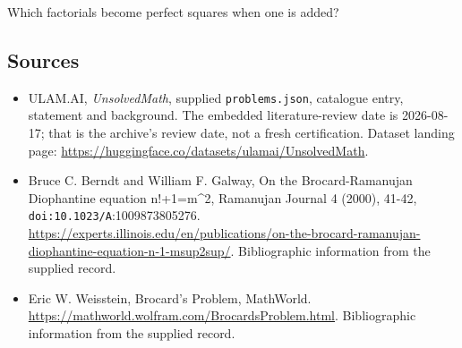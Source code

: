 \documentclass[11pt,a4paper]{article}
\begin{document}
Which factorials become perfect squares when one is added?

\subsection{Sources}

{\small

\begin{itemize}

\item[\hypertarget{source:statement:1}{S1}] ULAM.AI, \emph{UnsolvedMath}, supplied \texttt{problems.json}, catalogue entry, statement and background. The embedded literature-review date is 2026-08-17; that is the archive’s review date, not a fresh certification. Dataset landing page: \url{https://huggingface.co/datasets/ulamai/UnsolvedMath}.

\item[\hypertarget{source:statement:2}{S2}] Bruce C. Berndt and William F. Galway, On the Brocard-Ramanujan Diophantine equation n!+1=m\textasciicircum{}2, Ramanujan Journal 4 (2000), 41-42, \nolinkurl{doi:10.1023/A}:1009873805276. \url{https://experts.illinois.edu/en/publications/on-the-brocard-ramanujan-diophantine-equation-n-1-msup2sup/}. Bibliographic information from the supplied record.

\item[\hypertarget{source:statement:3}{S3}] Eric W. Weisstein, Brocard's Problem, MathWorld. \url{https://mathworld.wolfram.com/BrocardsProblem.html}. Bibliographic information from the supplied record.

\end{itemize}

}

\label{end:statement}
\end{document}
